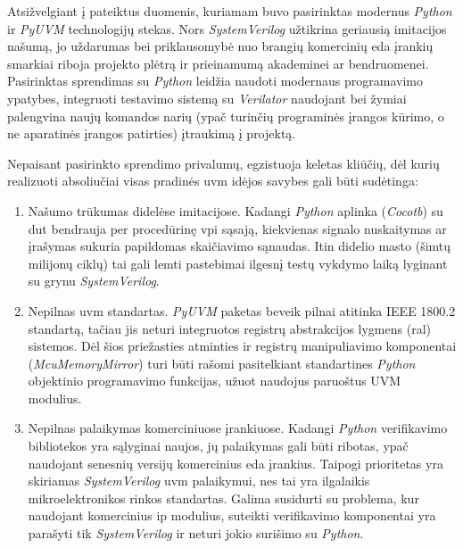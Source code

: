 Atsižvelgiant į \lent{\ref{tab:tech_galimybes_palyginimas}} pateiktus duomenis, kuriamam  buvo pasirinktas modernus \textit{Python} ir \textit{PyUVM} technologijų stekas. Nors \textit{SystemVerilog} užtikrina geriausią imitacijos našumą, jo uždarumas bei priklausomybė nuo brangių komercinių \gls{eda} įrankių smarkiai riboja projekto plėtrą ir prieinamumą akademinei ar  bendruomenei. Pasirinktas sprendimas su \textit{Python} leidžia naudoti modernaus programavimo ypatybes, integruoti testavimo sistemą su  \textit{Verilator}  naudojant  bei žymiai palengvina naujų komandos narių (ypač turinčių programinės įrangos kūrimo, o ne aparatinės įrangos patirties) įtraukimą į projektą.

Nepaisant pasirinkto sprendimo privalumų, egzistuoja keletas kliūčių, dėl kurių realizuoti absoliučiai visas pradinės \gls{uvm} idėjos savybes gali būti sudėtinga:
\begin{enumerate}
	\item Našumo trūkumas didelėse imitacijose. Kadangi \textit{Python} aplinka (\textit{Cocotb}) su \gls{dut} bendrauja per procedūrinę \gls{vpi} sąsają, kiekvienas signalo nuskaitymas ar įrašymas sukuria papildomas skaičiavimo sąnaudas. Itin didelio masto (šimtų milijonų ciklų)  tai gali lemti pastebimai ilgesnį testų vykdymo laiką lyginant su grynu \textit{SystemVerilog}.
	\item Nepilnas \gls{uvm} standartas. \textit{PyUVM} paketas beveik pilnai atitinka IEEE 1800.2 standartą, tačiau jis neturi integruotos registrų abstrakcijos lygmens (\gls{ral}) sistemos. Dėl šios priežasties atminties ir registrų manipuliavimo  komponentai (\textit{McuMemoryMirror}) turi būti rašomi pasitelkiant standartines \textit{Python} objektinio programavimo funkcijas, užuot naudojus paruoštus UVM modulius.
	\item Nepilnas palaikymas komerciniuose įrankiuose. Kadangi \textit{Python} verifikavimo bibliotekos yra sąlyginai naujos, jų palaikymas gali būti ribotas, ypač naudojant senesnių versijų komercinius \gls{eda} įrankius. Taipogi prioritetas yra skiriamas \textit{SystemVerilog} \gls{uvm} palaikymui, nes tai yra ilgalaikis mikroelektronikos rinkos standartas. Galima susidurti su problema, kur naudojant komercinius \gls{ip} modulius, suteikti verifikavimo komponentai yra parašyti tik \textit{SystemVerilog} ir neturi jokio surišimo su \textit{Python}.
\end{enumerate}

